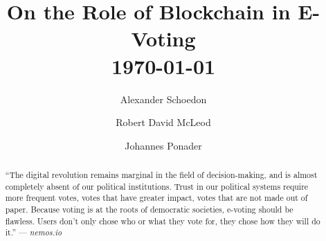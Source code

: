 \documentclass[9pt,oneside]{amsart}
\title{On the Role of Blockchain in E-Voting \\ {\smaller \today}}
\author{
    Alexander Schoedon
}
\author{
    Robert David McLeod
}
\author{
    Johannes Ponader
}
\begin{document}
\pagecolor{lightblue}

\begin{abstract}
\enquote{The digital revolution remains marginal in the field of decision-making, and is almost completely absent of our political institutions. Trust in our political systems require more frequent votes, votes that have greater impact, votes that are not made out of paper. Because voting is at the roots of democratic societies, e-voting should be flawless. Users don't only chose who or what they vote for, they chose how they will do it.} --- \textit{nemos.io} %

\end{abstract}

\maketitle

\setlength{\columnsep}{20pt}
\begin{multicols}{2}









\end{multicols}
\end{document}
